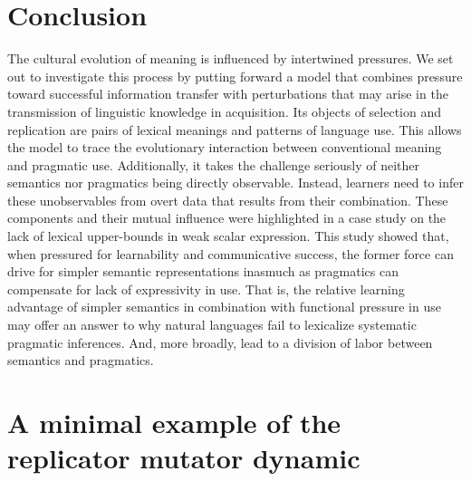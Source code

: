 \documentclass[a4paper, 11pt]{article}
\theoremstyle{Satz}
\begin{document}
\section{Conclusion}
The cultural evolution of meaning is influenced by intertwined pressures. We set out to
investigate this process by putting forward a model that combines pressure toward successful
information transfer with perturbations that may arise in the transmission of linguistic
knowledge in acquisition. Its objects of selection and replication are pairs of lexical
meanings and patterns of language use. This allows the model to trace the evolutionary interaction between
conventional meaning and pragmatic use. Additionally, it takes the challenge seriously of
neither semantics nor pragmatics being directly observable. Instead, learners need to infer
these unobservables from overt data that results from their combination.  These components and
their mutual influence were highlighted in a case study on the lack of lexical upper-bounds in
weak scalar expression. This study showed that, when pressured for learnability and communicative
success, the former force can drive for simpler semantic representations inasmuch as pragmatics
can compensate for lack of expressivity in use. That is, the relative learning advantage of
simpler semantics in combination with functional pressure in use may offer an answer to why
natural languages fail to lexicalize systematic pragmatic inferences. And, more broadly, lead to a
division of labor between semantics and pragmatics.

\appendix

\section{A minimal example of the replicator mutator dynamic}
\label{sec:minim-example-repl}
\end{document}
